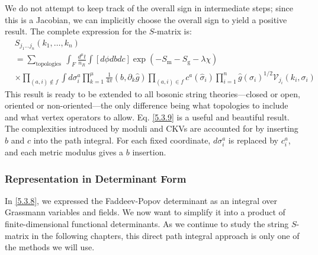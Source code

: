 We do not attempt to keep track of the overall sign in intermediate steps; since this is a Jacobian, we can implicitly choose the overall sign to yield a positive result. The complete expression for the $S$-matrix is:
\begin{equation}
	\begin{aligned}
		&S_{j_{1} \ldots j_{n}}\left(k_{1}, \ldots, k_{n}\right)\\
		&=\sum_{\text {topologies }} \int_{F} \frac{d^{\mu} t}{n_{R}} \int[d \phi d b d c] \exp \left(-S_{\mathrm{m}}-S_{\mathrm{g}}-\lambda \chi\right) \\
		&\times \prod_{(a, i) \notin f} \int d \sigma_{i}^{a} \prod_{k=1}^{\mu} \frac{1}{4 \pi}\left(b, \partial_{k} \hat{g}\right) \prod_{(a, i) \in f} c^{a}\left(\hat{\sigma}_{i}\right) \prod_{i=1}^{n} \hat{g}\left(\sigma_{i}\right)^{1 / 2} \mathscr{V}_{j_{i}}\left(k_{i}, \sigma_{i}\right)
	\end{aligned}\label{5.3.9}
\end{equation}
This result is ready to be extended to all bosonic string theories—closed or open, oriented or non-oriented—the only difference being what topologies to include and what vertex operators to allow. Eq. \eqref{5.3.9} is a useful and beautiful result. The complexities introduced by moduli and CKVs are accounted for by inserting $b$ and $c$ into the path integral. For each fixed coordinate, $d \sigma_{i}^{a}$ is replaced by $c_{i}^{a}$, and each metric modulus gives a $b$ insertion.

\subsubsection*{\Large Representation in Determinant Form}
In \eqref{5.3.8}, we expressed the Faddeev-Popov determinant as an integral over Grassmann variables and fields. We now want to simplify it into a product of finite-dimensional functional determinants. As we continue to study the string $S$-matrix in the following chapters, this direct path integral approach is only one of the methods we will use.

